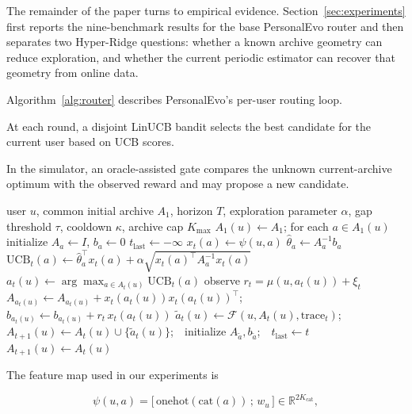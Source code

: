 \documentclass{article} %
\begin{document}
The remainder of the paper turns to empirical evidence. Section~\ref{sec:experiments}
first reports the nine-benchmark results for the base PersonalEvo router and
then separates two Hyper-Ridge questions: whether a known archive geometry can
reduce exploration, and whether the current periodic estimator can recover that
geometry from online data.


Algorithm~\ref{alg:router} describes PersonalEvo's per-user routing loop.

At each round, a disjoint LinUCB bandit selects the best candidate for the current user based on UCB scores.

In the simulator, an oracle-assisted gate compares the unknown current-archive optimum with the observed reward and may propose a new candidate.

\begin{algorithm}[t]
\caption{Per-user personalized routing over a growing archive.}
\label{alg:router}
\begin{algorithmic}[1]
\Require user $u$, common initial archive $A_1$, horizon $T$, exploration parameter $\alpha$, gap threshold $\tau$, cooldown $\kappa$, archive cap $K_{\max}$
\State $A_1(u) \gets A_1$; for each $a \in A_1(u)$ initialize $A_a \gets I$, $b_a \gets 0$
\State $t_{\mathrm{last}} \gets -\infty$
        \State $x_t(a) \gets \psi(u,a)$ 
        \State $\hat\theta_a \gets A_a^{-1} b_a$
        \State $\mathrm{UCB}_t(a) \gets \hat\theta_a^\top x_t(a) + \alpha \sqrt{x_t(a)^\top A_a^{-1} x_t(a)}$
    \EndFor
    \State $a_t(u) \gets \arg\max_{a \in A_t(u)} \mathrm{UCB}_t(a)$
    \State observe $r_t = \mu(u, a_t(u)) + \xi_t$
    \State $A_{a_t(u)} \gets A_{a_t(u)} + x_t(a_t(u)) x_t(a_t(u))^\top$;\quad $b_{a_t(u)} \gets b_{a_t(u)} + r_t \, x_t(a_t(u))$
     
        \State $\tilde a_t(u) \gets \mathcal{F}(u, A_t(u), \mathrm{trace}_t)$;\ \ $A_{t+1}(u) \gets A_t(u) \cup \{\tilde a_t(u)\}$;\ \ initialize $A_{\tilde a}, b_{\tilde a}$;\ \ $t_{\mathrm{last}} \gets t$
    \Else
        \State $A_{t+1}(u) \gets A_t(u)$
    \EndIf
\EndFor
\end{algorithmic}
\end{algorithm}

The feature map used in our experiments is

\begin{equation}
\label{eq:method-feat}
\psi(u,a) = \big[\,\mathrm{onehot}(\mathrm{cat}(a))\,;\, w_u\,\big] \in \mathbb{R}^{2K_{\mathrm{cat}}},
\end{equation}
\end{document}
